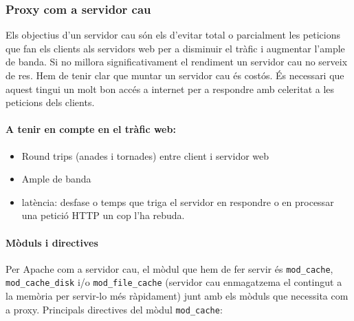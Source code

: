 \documentclass[a4paper, 11pt]{article}
\begin{document}
\subsubsection{Proxy com a servidor cau}
Els objectius d'un servidor cau són els d'evitar total o parcialment les peticions que fan els clients als servidors web per a disminuir el tràfic i augmentar l'ample de banda. Si no millora significativament el rendiment un servidor cau no serveix de res. Hem de tenir clar que muntar un servidor cau \'es costós. \'Es necessari que aquest tingui un molt bon acc\'es a internet per a respondre amb celeritat a les peticions dels clients. 

\paragraph{A tenir en compte en el tràfic web:}

\begin{itemize}
	\item Round trips (anades i tornades) entre client i servidor web
	\item Ample de banda
	\item latència: desfase o temps que triga el servidor en respondre o en processar una petició HTTP un cop l'ha rebuda.
\end{itemize}

\paragraph{Mòduls i directives \\}

Per Apache com a servidor cau, el mòdul que hem de fer servir \'es \verb+mod_cache+, \verb+mod_cache_disk+ i/o \verb+mod_file_cache+ (servidor cau enmagatzema el contingut a la memòria per servir-lo m\'es ràpidament) junt amb els mòduls que necessita com a proxy. Principals directives del mòdul \verb+mod_cache+:
\end{document}
